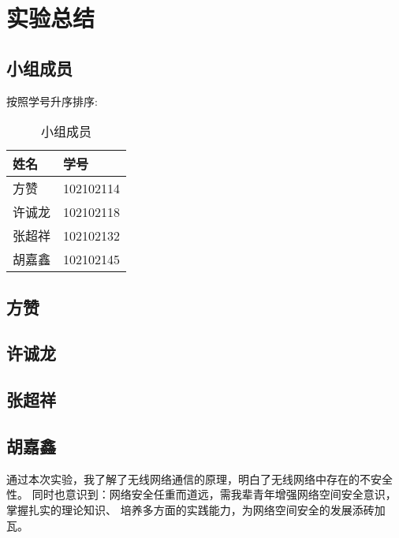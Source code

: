 \documentclass[../main.tex]{subfiles}
\begin{document}
\section{实验总结}
\subsection{小组成员}
按照学号升序排序:
\begin{table}[H]
  \caption{小组成员}
  \begin{center}
    \begin{tabular}[c]{ll}
      \hline
      姓名 & 学号 \\
      \hline
      方赞 & 102102114 \\
      许诚龙 & 102102118 \\
      张超祥 & 102102132 \\
      胡嘉鑫 & 102102145 \\
      \hline
    \end{tabular}
  \end{center}
\end{table}
%
\subsection{方赞}
%
\subsection{许诚龙}
%
\subsection{张超祥}
%
\subsection{胡嘉鑫}
通过本次实验，我了解了无线网络通信的原理，明白了无线网络中存在的不安全性。
同时也意识到：网络安全任重而道远，需我辈青年增强网络空间安全意识，掌握扎实的理论知识、
培养多方面的实践能力，为网络空间安全的发展添砖加瓦。
%
\end{document}
